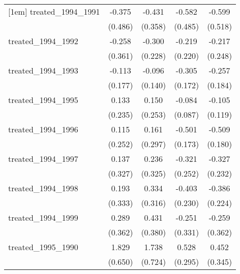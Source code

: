 {\begin{tabular}{l*{4}{c}}
[1em]
treated\_1994\_1991&      -0.375         &      -0.431         &      -0.582         &      -0.599         \\
            &     (0.486)         &     (0.358)         &     (0.485)         &     (0.518)         \\
[1em]
treated\_1994\_1992&      -0.258         &      -0.300         &      -0.219         &      -0.217         \\
            &     (0.361)         &     (0.228)         &     (0.220)         &     (0.248)         \\
[1em]
treated\_1994\_1993&      -0.113         &      -0.096         &      -0.305         &      -0.257         \\
            &     (0.177)         &     (0.140)         &     (0.172)         &     (0.184)         \\
[1em]
treated\_1994\_1995&       0.133         &       0.150         &      -0.084         &      -0.105         \\
            &     (0.235)         &     (0.253)         &     (0.087)         &     (0.119)         \\
[1em]
treated\_1994\_1996&       0.115         &       0.161         &      -0.501\sym{**} &      -0.509\sym{**} \\
            &     (0.252)         &     (0.297)         &     (0.173)         &     (0.180)         \\
[1em]
treated\_1994\_1997&       0.137         &       0.236         &      -0.321         &      -0.327         \\
            &     (0.327)         &     (0.325)         &     (0.252)         &     (0.232)         \\
[1em]
treated\_1994\_1998&       0.193         &       0.334         &      -0.403         &      -0.386         \\
            &     (0.333)         &     (0.316)         &     (0.230)         &     (0.224)         \\
[1em]
treated\_1994\_1999&       0.289         &       0.431         &      -0.251         &      -0.259         \\
            &     (0.362)         &     (0.380)         &     (0.331)         &     (0.362)         \\
[1em]
treated\_1995\_1990&       1.829\sym{**} &       1.738\sym{*}  &       0.528         &       0.452         \\
            &     (0.650)         &     (0.724)         &     (0.295)         &     (0.345)         \\

\end{tabular}}
